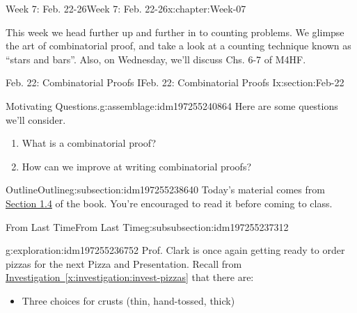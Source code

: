 \documentclass[oneside,10pt,]{book}
\newcommand{\xreffont}{\relax}
\numberwithin{equation}{section}
\begin{document}
\begin{chapterptx}{Week 7: Feb. 22-26}{}{Week 7: Feb. 22-26}{}{}{x:chapter:Week-07}
\begin{introduction}{}%
This week we head further up and further in to counting problems. We glimpse the art of combinatorial proof, and take a look at a counting technique known as ``stars and bars''. Also, on Wednesday, we'll discuss Chs. 6-7 of M4HF.%
\end{introduction}%
%
%
\typeout{************************************************}
\typeout{************************************************}
%
\begin{sectionptx}{Feb. 22: Combinatorial Proofs I}{}{Feb. 22: Combinatorial Proofs I}{}{}{x:section:Feb-22}
\begin{introduction}{}%
\begin{assemblage}{Motivating Questions.}{g:assemblage:idm197255240864}%
Here are some questions we'll consider. %
\begin{enumerate}
\item{}What is a combinatorial proof?%
\item{}How can we improve at writing combinatorial proofs?%
\end{enumerate}
%
\end{assemblage}
\end{introduction}%
%
%
\typeout{************************************************}
\typeout{************************************************}
%
\begin{subsectionptx}{Outline}{}{Outline}{}{}{g:subsection:idm197255238640}
Today's material comes from \href{http://discrete.openmathbooks.org/dmoi3/sec_comb-proofs.html}{Section 1.4} of the book. You're encouraged to read it before coming to class.%
%
%
\typeout{************************************************}
\typeout{************************************************}
%
\begin{subsubsectionptx}{From Last Time}{}{From Last Time}{}{}{g:subsubsection:idm197255237312}
\begin{exploration}{}{g:exploration:idm197255236752}%
Prof. Clark is once again getting ready to order pizzas for the next Pizza and Presentation. Recall from \hyperref[x:investigation:invest-pizzas]{Investigation~{\xreffont\ref{x:investigation:invest-pizzas}}} that there are:%
%
\begin{itemize}[label=\textbullet]
\item{}Three choices for crusts (thin, hand-tossed, thick)%

\end{itemize}
\end{exploration}
\end{subsubsectionptx}
\end{subsectionptx}
\end{sectionptx}
\end{chapterptx}
\end{document}
